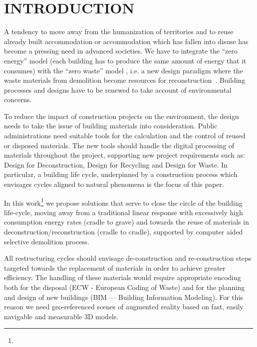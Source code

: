 \section{\uppercase{Introduction}}
\label{sec:introduction}

\noindent
A tendency to move away from the humanization of territories and to reuse already  built accommodation or accommodation which has fallen into disuse has become a pressing need in advanced societies. We have to integrate the ``zero energy'' model (each building has to produce the same amount of energy that it consumes) with the ``zero waste'' model , i.e. a new design paradigm where the waste materials from demolition become resources for reconstruction~\cite{altamura:12}. Building processes and designs have to be renewed to take account of environmental concerns. 

To reduce the impact of construction projects on the environment, the design needs to take the issue of building materials into consideration. Public administrations need suitable tools for the calculation and the control of reused or disposed materials. The new tools should handle the digital processing of materials throughout the project, supporting new project requirements such as: Design for Deconstruction, Design for Recycling and Design for Waste. In particular, a building life cycle, underpinned by a construction process which envisages cycles aligned to natural phenomena is the focus of this paper. 

In this work\footnote{\acks} we propose solutions that serve to close the circle of the building life-cycle, moving away from a traditional linear response with excessively high consumption energy rates (cradle to grave) and towards the reuse of materials in deconstruction/reconstruction (cradle to cradle), supported by computer aided selective demolition process.

All restructuring cycles should envisage de-construction and re-construction steps targeted towards the replacement of materials in order to achieve greater efficiency. The handling of these materials would require appropriate encoding both for the disposal (ECW - European Coding of Waste) and for the planning and design of new buildings (BIM --- Building Information Modeling). For this reason we need geo-referenced scenes of augmented reality based on fast, easily navigable and measurable 3D models. 

